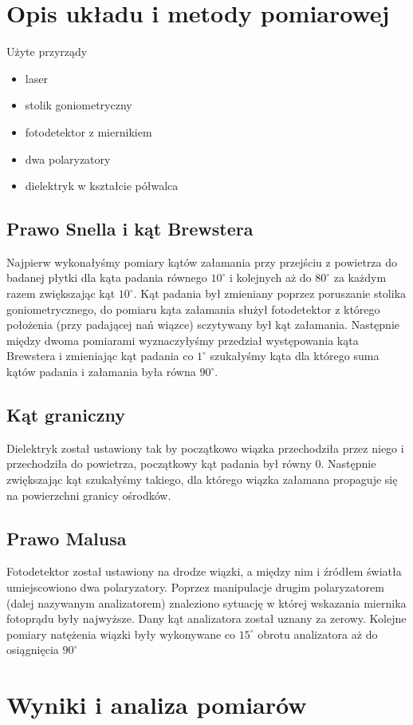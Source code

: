 \documentclass[a4paper,10pt]{article}
\begin{document}
\section{Opis układu i metody pomiarowej}
Użyte przyrządy
\begin{itemize}
  \item laser
  \item stolik goniometryczny
  \item fotodetektor z miernikiem
  \item dwa polaryzatory
  \item dielektryk w kształcie półwalca
\end{itemize}
\subsection{Prawo Snella i kąt Brewstera}
Najpierw wykonałyśmy pomiary kątów załamania przy przejściu z powietrza do badanej płytki dla kąta padania
równego $10^\circ$ i kolejnych aż do $80^\circ$ za każdym razem zwiększając kąt $10^\circ$. Kąt padania był zmieniany
poprzez poruszanie stolika goniometrycznego, do pomiaru kąta załamania służył fotodetektor z którego położenia (przy padającej nań wiązce)
sczytywany był kąt załamania. Następnie między dwoma pomiarami wyznaczyłyśmy przedział występowania kąta Brewstera i zmieniając kąt padania co
$1^\circ$ szukałyśmy kąta dla którego suma kątów padania i załamania była równa $90^\circ$.
\subsection{Kąt graniczny}
Dielektryk został ustawiony tak by początkowo wiązka przechodziła przez niego i przechodziła do powietrza, początkowy kąt padania był równy 0.
Następnie zwiększając kąt szukałyśmy takiego, dla którego wiązka załamana propaguje się na powierzchni granicy ośrodków.
\subsection{Prawo Malusa}
Fotodetektor został ustawiony na drodze wiązki, a między nim i źródłem światła umiejscowiono dwa polaryzatory. Poprzez manipulacje drugim
polaryzatorem (dalej nazywanym analizatorem) znaleziono sytuację w której wskazania miernika fotoprądu były najwyższe. Dany kąt analizatora
został uznany za zerowy. Kolejne pomiary natężenia wiązki były wykonywane co $15^\circ$ obrotu analizatora aż do osiągnięcia $90^\circ$
\section{Wyniki i analiza pomiarów}
\end{document}
